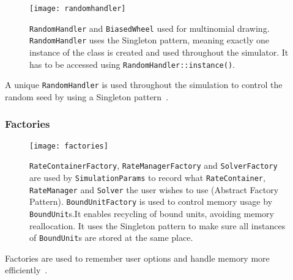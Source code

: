 \begin{figure}[!h]
  \centering
  \texttt{[image: randomhandler]}
  \caption{\texttt{RandomHandler} and \texttt{BiasedWheel} used for multinomial drawing. \texttt{RandomHandler} uses the Singleton pattern, meaning exactly one instance of the class is created and used throughout the simulator. It has to be accessed using \texttt{RandomHandler::instance()}.}
  \label{fig:random_handler}
\end{figure}

A unique \texttt{RandomHandler} is used throughout the simulation to control the random seed by using a Singleton pattern~.

\subsubsection{Factories}

\begin{figure}[!h]
  \centering
  \texttt{[image: factories]}
  \caption{\texttt{RateContainerFactory}, \texttt{RateManagerFactory} and \texttt{SolverFactory} are used by \texttt{SimulationParams} to record what \texttt{RateContainer}, \texttt{RateManager} and \texttt{Solver} the user wishes to use (Abstract Factory Pattern). \texttt{BoundUnitFactory} is used to control memory usage by \texttt{BoundUnit}s.It enables recycling of bound units, avoiding memory reallocation. It uses the Singleton pattern to make sure all instances of \texttt{BoundUnit}s are stored at the same place.}
  \label{fig:factories}
\end{figure}

Factories are used to remember user options and handle memory more efficiently~.

